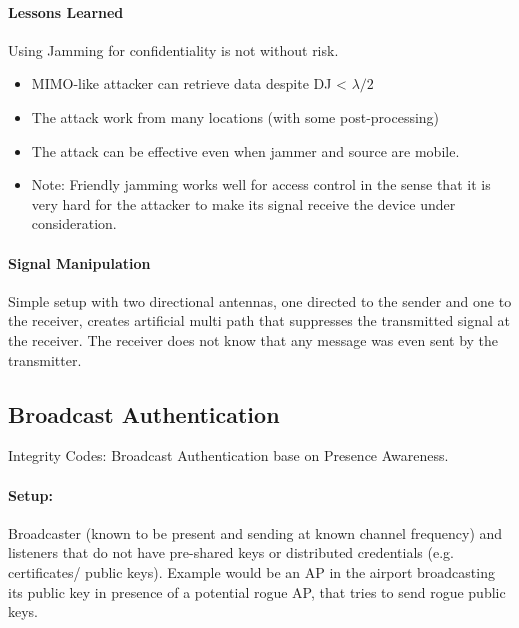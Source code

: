 \paragraph{Lessons Learned}
Using Jamming for confidentiality is not without risk.
\begin{itemize}
    \item MIMO-like attacker can retrieve data despite DJ < $\lambda/2$
    \item The attack work from many locations (with some post-processing)
    \item The attack can be effective even when jammer and source are mobile.
    \item Note: Friendly jamming works well for access control in the sense that it is very hard for the attacker to make its signal receive the device under consideration.
\end{itemize}

\paragraph{Signal Manipulation}
Simple setup with two directional antennas, one directed to the sender and one to the receiver, creates artificial multi path that suppresses the transmitted signal at the receiver. The receiver does not know that any message was even sent by the transmitter.

\subsection{Broadcast Authentication}
Integrity Codes: Broadcast Authentication base on Presence Awareness.

\paragraph{Setup:} Broadcaster (known to be present and sending at known channel frequency) and listeners that do not have pre-shared keys or distributed credentials (e.g. certificates/ public keys). Example would be an AP in the airport broadcasting its public key in presence of a potential rogue AP, that tries to send rogue public keys.

